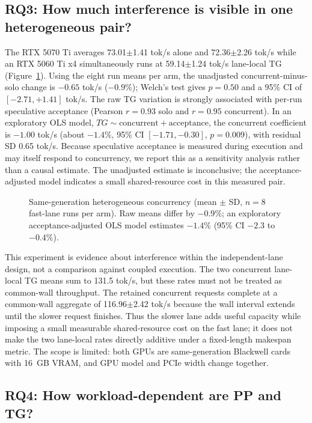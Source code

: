 \subsection{RQ3: How much interference is visible in one heterogeneous pair?}
The RTX 5070 Ti averages 73.01$\pm$1.41 tok/s alone and 72.36$\pm$2.26 tok/s while an RTX 5060 Ti x4 simultaneously runs at 59.14$\pm$1.24 tok/s lane-local TG (Figure~\ref{fig:hetero}). Using the eight run means per arm, the unadjusted concurrent-minus-solo change is $-0.65$ tok/s ($-0.9\%$); Welch's test gives $p=0.50$ and a 95\% CI of $[-2.71,+1.41]$ tok/s. The raw TG variation is strongly associated with per-run speculative acceptance (Pearson $r=0.93$ solo and $r=0.95$ concurrent). In an exploratory OLS model, $TG\sim\mathrm{concurrent}+\mathrm{acceptance}$, the concurrent coefficient is $-1.00$ tok/s (about $-1.4\%$, 95\% CI $[-1.71,-0.30]$, $p=0.009$), with residual SD 0.65 tok/s. Because speculative acceptance is measured during execution and may itself respond to concurrency, we report this as a sensitivity analysis rather than a causal estimate. The unadjusted estimate is inconclusive; the acceptance-adjusted model indicates a small shared-resource cost in this measured pair.

\begin{figure}[t]
\centering
{}
\caption{Same-generation heterogeneous concurrency (mean $\pm$ SD, $n=8$ fast-lane runs per arm). Raw means differ by $-0.9\%$; an exploratory acceptance-adjusted OLS model estimates $-1.4\%$ (95\% CI $-2.3$ to $-0.4\%$).}
\label{fig:hetero}
\end{figure}

This experiment is evidence about interference within the independent-lane design, not a comparison against coupled execution. The two concurrent lane-local TG means sum to 131.5 tok/s, but these rates must not be treated as common-wall throughput. The retained concurrent requests complete at a common-wall aggregate of 116.96$\pm$2.42 tok/s because the wall interval extends until the slower request finishes. Thus the slower lane adds useful capacity while imposing a small measurable shared-resource cost on the fast lane; it does not make the two lane-local rates directly additive under a fixed-length makespan metric. The scope is limited: both GPUs are same-generation Blackwell cards with 16~GB VRAM, and GPU model and PCIe width change together.

\subsection{RQ4: How workload-dependent are PP and TG?}

